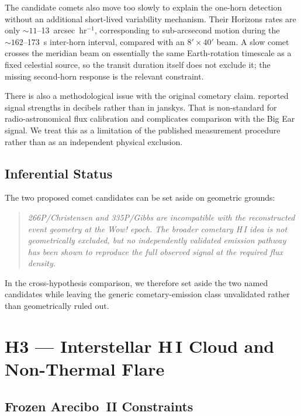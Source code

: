 \documentclass[crop]{CSL}
\begin{document}
The candidate comets also move too slowly to explain the one-horn detection without an additional short-lived variability mechanism. Their Horizons rates are only $\sim11$--13~arcsec~hr$^{-1}$, corresponding to sub-arcsecond motion during the $\sim162$--173~s inter-horn interval, compared with an $8'\times40'$ beam. A slow comet crosses the meridian beam on essentially the same Earth-rotation timescale as a fixed celestial source, so the transit duration itself does not exclude it; the missing second-horn response is the relevant constraint.

There is also a methodological issue with the original cometary claim. \citet{paris2017} reported signal strengths in decibels rather than in janskys. That is non-standard for radio-astronomical flux calibration and complicates comparison with the Big Ear signal. We treat this as a limitation of the published measurement procedure rather than as an independent physical exclusion.

\subsection{Inferential Status}

The two proposed comet candidates can be set aside on geometric grounds:
\begin{quote}
\emph{266P/Christensen and 335P/Gibbs are incompatible with the reconstructed event geometry at the Wow! epoch. The broader cometary H\,I idea is not geometrically excluded, but no independently validated emission pathway has been shown to reproduce the full observed signal at the required flux density.}
\end{quote}

In the cross-hypothesis comparison, we therefore set aside the two named candidates while leaving the generic cometary-emission class unvalidated rather than geometrically ruled out.


\section{H3 --- Interstellar H\,I Cloud and Non-Thermal Flare}
\label{sec:h3}

\subsection{Frozen Arecibo~II Constraints}
\end{document}
